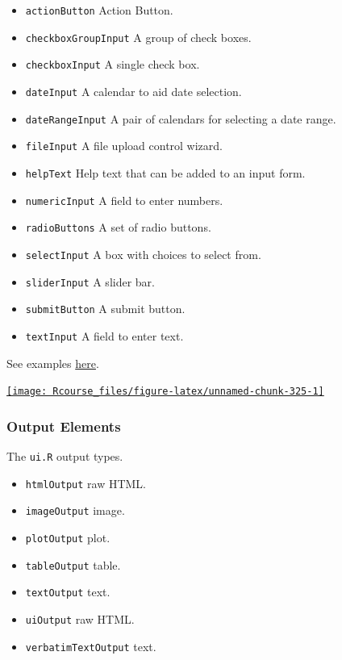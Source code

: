 \documentclass[]{book}
\providecommand{\tightlist}{%
  \setlength{\itemsep}{0pt}\setlength{\parskip}{0pt}}
\theoremstyle{definition}
\theoremstyle{definition}
\theoremstyle{definition}
\theoremstyle{remark}
\begin{document}
\begin{itemize}
\tightlist
\item
  \texttt{actionButton} Action Button.
\item
  \texttt{checkboxGroupInput} A group of check boxes.
\item
  \texttt{checkboxInput} A single check box.
\item
  \texttt{dateInput} A calendar to aid date selection.
\item
  \texttt{dateRangeInput} A pair of calendars for selecting a date
  range.
\item
  \texttt{fileInput} A file upload control wizard.
\item
  \texttt{helpText} Help text that can be added to an input form.
\item
  \texttt{numericInput} A field to enter numbers.
\item
  \texttt{radioButtons} A set of radio buttons.
\item
  \texttt{selectInput} A box with choices to select from.
\item
  \texttt{sliderInput} A slider bar.
\item
  \texttt{submitButton} A submit button.
\item
  \texttt{textInput} A field to enter text.
\end{itemize}

See examples
\href{https://shiny.rstudio.com/gallery/widget-gallery.html}{here}.

\href{https://shiny.rstudio.com/gallery/widget-gallery.html}{\texttt{[image: Rcourse\_files/figure-latex/unnamed-chunk-325-1]} }

\subsubsection{Output Elements}\label{output-elements}

The \texttt{ui.R} output types.

\begin{itemize}
\tightlist
\item
  \texttt{htmlOutput} raw HTML.
\item
  \texttt{imageOutput} image.
\item
  \texttt{plotOutput} plot.
\item
  \texttt{tableOutput} table.
\item
  \texttt{textOutput} text.
\item
  \texttt{uiOutput} raw HTML.
\item
  \texttt{verbatimTextOutput} text.
\end{itemize}
\end{document}
